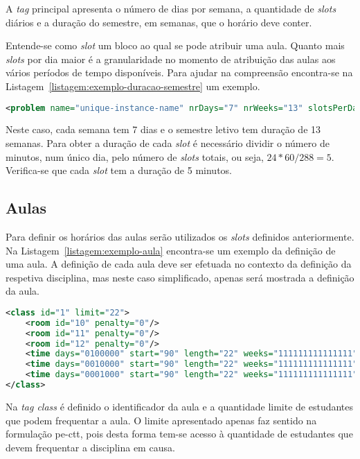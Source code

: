 A \textit{tag} principal apresenta o número de dias por semana, a quantidade de \textit{slots} diários e a duração do semestre, em semanas, que o horário deve conter.

Entende-se como \textit{slot} um bloco ao qual se pode atribuir uma aula. Quanto mais \textit{slots} por dia maior é a granularidade no momento de atribuição das aulas aos vários períodos de tempo disponíveis. Para ajudar na compreensão encontra-se na Listagem~\ref{listagem:exemplo-duracao-semestre} um exemplo.

\begin{lstlisting}[language=XML, float, caption={Exemplo da definição da duração do semestre.}, label={listagem:exemplo-duracao-semestre}]
<problem name="unique-instance-name" nrDays="7" nrWeeks="13" slotsPerDay="288">
\end{lstlisting}

Neste caso, cada semana tem 7 dias e o semestre letivo tem duração de 13 semanas. Para obter a duração de cada \textit{slot} é necessário dividir o número de minutos, num único dia, pelo número de \textit{slots} totais, ou seja, $24*60/288 = 5$. Verifica-se que cada \textit{slot} tem a duração de 5 minutos.

\subsection{Aulas}

Para definir os horários das aulas serão utilizados os \textit{slots} definidos anteriormente. Na Listagem~\ref{listagem:exemplo-aula} encontra-se um exemplo da definição de uma aula. A definição de cada aula deve ser efetuada no contexto da definição da respetiva disciplina, mas neste caso simplificado, apenas será mostrada a definição da aula.

\begin{lstlisting}[language=XML, float, caption={Exemplo da definição de uma aula.}, label={listagem:exemplo-aula}]
<class id="1" limit="22">
    <room id="10" penalty="0"/>
    <room id="11" penalty="0"/>
    <room id="12" penalty="0"/>
    <time days="0100000" start="90" length="22" weeks="111111111111111" penalty="0"/>
    <time days="0010000" start="90" length="22" weeks="111111111111111" penalty="0"/>
    <time days="0001000" start="90" length="22" weeks="111111111111111" penalty="0"/>
</class>
\end{lstlisting}

Na \textit{tag class} é definido o identificador da aula e a quantidade limite de estudantes que podem frequentar a aula. O limite apresentado apenas faz sentido na formulação \gls{pe-ctt}, pois desta forma tem-se acesso à quantidade de estudantes que devem frequentar a disciplina em causa.

